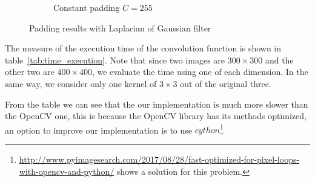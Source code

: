 \begin{figure}[h!]
\begin{subfigure}{0.25\textwidth}
  \centering
  \caption{Constant padding $C = 255$}
\end{subfigure}
 \caption{Padding results with Laplacian of Gaussian filter}
\label{fig:padding-strategy}
\end{figure}

\vspace{2cm}

The measure of the execution time of the convolution function is shown in table~\ref{tab:time_execution}. Note that since two images are $300 \times 300$ and the other two are $400 \times 400$, we evaluate the time using one of each dimension. In the same way, we consider only one kernel of $ 3 \times 3$ out of the original three.

From the table we can see that the our implementation is much more slower than the OpenCV one, this is because the OpenCV library has its methods optimized, an option to improve our implementation is to use $cython$\footnote{\url{http://www.pyimagesearch.com/2017/08/28/fast-optimized-for-pixel-loops-with-opencv-and-python/} shows a solution for this problem.}

